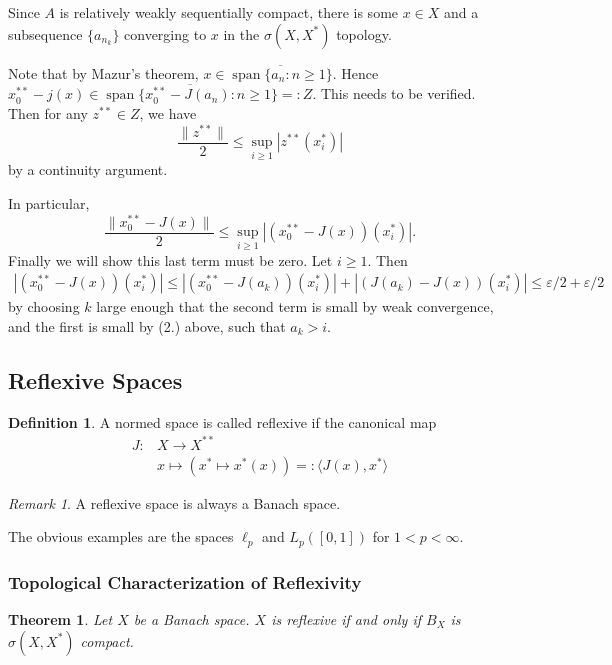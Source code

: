 \documentclass[11pt, reqno]{article}
\theoremstyle{plain}
\newtheorem*{theorem}{Theorem}
\theoremstyle{definition}
\newtheorem*{definition}{Definition}
\theoremstyle{remark}
\newtheorem*{remark}{Remark}
\renewcommand{\epsilon}{\varepsilon}
\begin{document}
Since $A$ is relatively weakly sequentially compact, there is some $x \in X$ and a subsequence $\{a_{n_k}\}$ 
converging to $x$ in the $\sigma(X, X^*)$ topology.

Note that by Mazur's theorem, $x \in \overline{\operatorname{span}\{a_n: n \geq 1\}}$. Hence 
$x_0^{**} - j(x) \in \overline{\operatorname{span}\{x_0^{**} - J(a_n): n \geq 1\}} =: Z$. 
This needs to be verified. Then for any $z^{**} \in Z$, we have 
\[
    \frac{\|z^{**}\|}{2} \leq \sup\limits_{i \geq 1} |z^{**}(x_i^*)|
\]
by a continuity argument.

In particular, 
\[
    \frac{\|x_0^{**} - J(x)\|}{2} \leq \sup\limits_{i \geq 1} |(x_0^{**} - J(x))(x_i^*)|.
\]
Finally we will show this last term must be zero. Let $i \geq 1$. Then 
\begin{align*}
    |(x_0^{**} - J(x))(x_i^*)| \leq |(x_0^{**} - J(a_k))(x_i^*)| + |(J(a_k) - J(x))(x_i^*)| \leq \epsilon/2 + \epsilon/2
\end{align*}
by choosing $k$ large enough that the second term is small by weak convergence, and the first is small by (2.) above,
such that $a_k > i$.

\subsection*{Reflexive Spaces}

\begin{definition}
    A normed space is called reflexive if the canonical map 
    \begin{align*}
        J: & X \rightarrow X^{**}\\
        & x \mapsto (x^* \mapsto x^*(x)) =: \langle J(x), x^*\rangle
    \end{align*}
\end{definition}

\begin{remark}
    A reflexive space is always a Banach space.
\end{remark}

The obvious examples are the spaces $\ell_p$ and $L_p([0,1])$ for $1 < p < \infty$.

\subsubsection*{Topological Characterization of Reflexivity}

\begin{theorem}
    Let $X$ be a Banach space. $X$ is reflexive if and only if $B_X$ is $\sigma(X, X^*)$ compact.
\end{theorem}
\end{document}

